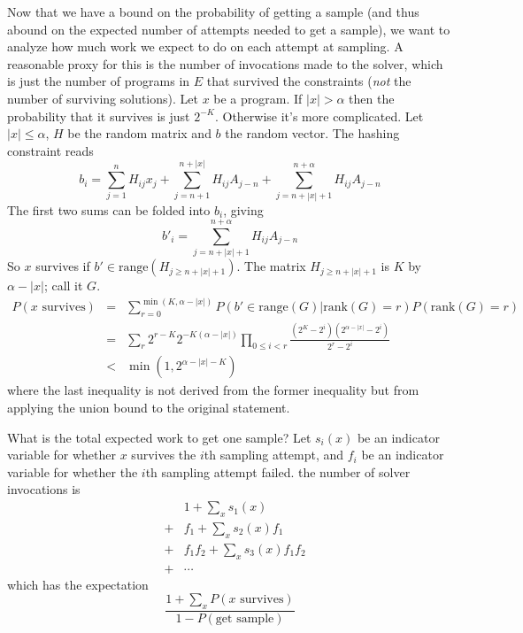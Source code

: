 \documentclass{article}
\begin{document}
Now that we have a bound on the probability of getting a sample (and thus abound on the expected number of attempts needed to get a sample),
we want to analyze how much work we expect to do on each attempt at sampling.
A reasonable proxy for this is the number of invocations made to the solver,
which is just the number of programs in $E$ that survived the constraints (\emph{not} the number of surviving solutions).
Let $x$ be a program.
If $|x|>\alpha$ then the probability that it survives is just $2^{-K}$.
Otherwise it's more complicated.
Let $|x|\leq \alpha$, $H$ be the random matrix and $b$ the random vector.
The hashing constraint reads
\begin{equation}
  b_i = \sum_{j = 1}^n H_{ij}x_j + \sum_{j = n+1}^{n+|x|}H_{ij}A_{j-n} + \sum_{j = n + |x| + 1}^{n + \alpha}H_{ij}A_{j-n}
\end{equation}
The first two sums can be folded into $b_i$, giving
\begin{equation}
  b'_i = \sum_{j = n + |x| + 1}^{n + \alpha}H_{ij}A_{j-n}
\end{equation}
So $x$ survives if $b'\in\text{range}(H_{j\geq n + |x| + 1})$.
The matrix $H_{j\geq n + |x| + 1}$ is $K$ by $\alpha - |x|$; call it $G$.
\begin{eqnarray}
  P(x \text{ survives})& = &\sum_{r = 0}^{\min(K,\alpha - |x|)}P(b'\in\text{range}(G) | \text{rank}(G) = r)P(\text{rank}(G) = r)\\
  & = &\sum_r 2^{r - K}2^{-K(\alpha - |x|)}\prod_{0\leq i<r}\frac{(2^K - 2^i)(2^{\alpha - |x|} - 2^i)}{2^r - 2^i}\\
  &<&\min (1,2^{\alpha - |x| - K})
\end{eqnarray}
where the last inequality is not derived from the former inequality but from applying the union bound to the original statement.

What is the total expected work to get one sample?
Let $s_i(x)$ be an indicator variable for whether $x$ survives the $i$th sampling attempt,
and $f_i$ be an indicator variable for whether the $i$th sampling attempt failed.
the number of solver invocations is
\begin{eqnarray*}
  &&1 + \sum_x s_1(x)\\
  &+&f_1 + \sum_xs_2(x)f_1\\
  &+&f_1f_2 + \sum_xs_3(x)f_1f_2\\
  &+&\cdots
\end{eqnarray*}
which has the expectation
\begin{equation}
  \frac{1 + \sum_x P(x \text{ survives})}{1 - P(\text{get sample})}
  \end{equation}
\end{document}
